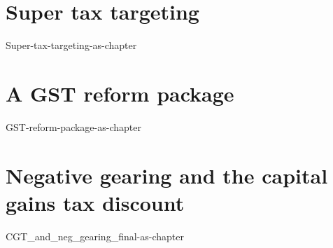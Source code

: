 \part{Super tax targeting}\label{part:SUPER}
{Super-tax-targeting-as-chapter}

\part{A GST reform package}\label{part:GST}
{GST-reform-package-as-chapter}

\part{Negative gearing and the capital gains tax discount}
{CGT_and_neg_gearing_final-as-chapter}




%
\newpage
\cleardoublepage
{}
\listoffigures
\printfigurenotes
\printtablenotes
\cleardoublepage
\listoftables
\cleardoublepage

\printendnotes
{}
\printbibliography[title={Bibliography},heading=none]

